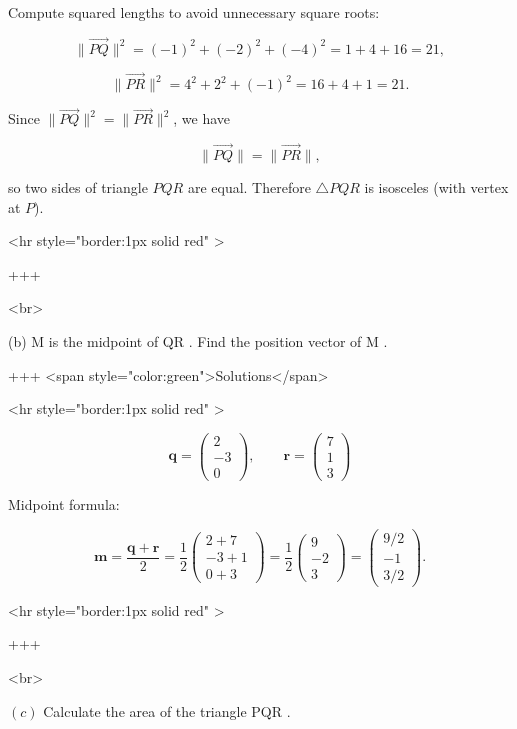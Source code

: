 Compute squared lengths to avoid unnecessary square roots:

$$
\lVert\overrightarrow{PQ}\rVert^2=(-1)^2+(-2)^2+(-4)^2=1+4+16=21,
$$


$$
\lVert\overrightarrow{PR}\rVert^2=4^2+2^2+(-1)^2=16+4+1=21.
$$


Since $\lVert\overrightarrow{PQ}\rVert^2=\lVert\overrightarrow{PR}\rVert^2$, we have

$$
\lVert\overrightarrow{PQ}\rVert=\lVert\overrightarrow{PR}\rVert,
$$

so two sides of triangle $PQR$ are equal. Therefore $\triangle PQR$ is isosceles (with vertex at $P$).

<hr style="border:1px solid red" >

+++

<br>

(b) M is the midpoint of QR . Find the position vector of M .

+++ <span style="color:green">Solutions</span>

<hr style="border:1px solid red" >

$$
\mathbf{q}=\begin{pmatrix}2\\-3\\0\end{pmatrix},\qquad
\mathbf{r}=\begin{pmatrix}7\\1\\3\end{pmatrix}
$$


Midpoint formula:

$$
\mathbf{m}=\frac{\mathbf{q}+\mathbf{r}}{2}
=\frac{1}{2}\begin{pmatrix}2+7\\-3+1\\0+3\end{pmatrix}
=\frac{1}{2}\begin{pmatrix}9\\-2\\3\end{pmatrix}
=\begin{pmatrix}9/2\\-1\\3/2\end{pmatrix}.
$$

<hr style="border:1px solid red" >

+++

<br>

\((c)\) Calculate the area of the triangle PQR .


